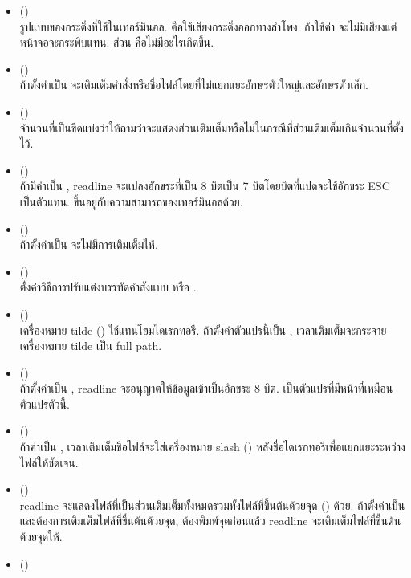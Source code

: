 \begin{thwbr}
\begin{enumerate}
\begin{itemize}
\item {} ()\\
รูปแบบของกระดิ่งที่ใช้ในเทอร์มินอล.  คือใช้เสียงกระดิ่งออกทางลำโพง. ถ้าใช้ค่า  จะไม่มีเสียงแต่หน้าจอจะกระพิบแทน. ส่วน  คือไม่มีอะไรเกิดขึ้น.
\item {} ()\\
ถ้าตั้งค่าเป็น  จะเติมเต็มคำสั่งหรือชื่อไฟล์โดยที่ไม่แยกแยะอักษรตัวใหญ่และอักษรตัวเล็ก.
\item {} ()\\
จำนวนที่เป็นขีดแบ่งว่าให้ถามว่าจะแสดงส่วนเติมเต็มหรือไม่ในกรณีที่ส่วนเติมเต็มเกินจำนวนที่ตั้งไว้.
\item {} ()\\
ถ้ามีค่าเป็น , readline จะแปลงอักขระที่เป็น 8 บิตเป็น 7 บิตโดยบิตที่แปดจะใช้อักขระ ESC เป็นตัวแทน. ขึ้นอยู่กับความสามารถของเทอร์มินอลด้วย.
\item {} ()\\
ถ้าตั้งค่าเป็น  จะไม่มีการเติมเต็มให้.
\item {} ()\\
ตั้งค่าวิธีการปรับแต่งบรรทัดคำสั่งแบบ  หรือ .
\item {} ()\\
เครื่องหมาย tilde (\cmd{\~{ }}) ใช้แทนโฮมไดเรกทอรี. ถ้าตั้งค่าตัวแปรนี้เป็น , เวลาเติมเต็มจะกระจายเครื่องหมาย tilde เป็น full path.
\item {} ()\\
ถ้าตั้งค่าเป็น , readline จะอนุญาตให้ข้อมูลเข้าเป็นอักขระ 8 บิต.  เป็นตัวแปรที่มีหน้าที่เหมือนตัวแปรตัวนี้.
\item {} ()\\
ถ้าค่าเป็น , เวลาเติมเต็มชื่อไฟล์จะใส่เครื่องหมาย slash (\cmd{/}) หลังชื่อไดเรกทอรีเพื่อแยกแยะระหว่างไฟล์ให้ชัดเจน.
\item {} ()\\
readline จะแสดงไฟล์ที่เป็นส่วนเติมเต็มทั้งหมดรวมทั้งไฟล์ที่ขึ้นต้นด้วยจุด () ด้วย. ถ้าตั้งค่าเป็น  และต้องการเติมเต็มไฟล์ที่ขึ้นต้นด้วยจุด, ต้องพิมพ์จุดก่อนแล้ว readline จะเติมเต็มไฟล์ที่ขึ้นต้นด้วยจุดให้.
\item {} ()\\

\end{itemize}
\end{enumerate}
\end{thwbr}
